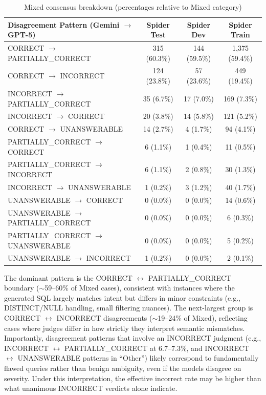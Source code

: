 \documentclass[]{einformatica}
\begin{document}
\begin{table}[ht]
    \caption{Mixed consensus breakdown (percentages relative to Mixed category)}
    \label{tab:mixed_breakdown}
    \centering
    \footnotesize
    \begin{tabular}{lccc}
        \toprule
        \textbf{Disagreement Pattern (Gemini $\rightarrow$ GPT-5)} & \textbf{Spider Test} & \textbf{Spider Dev} & \textbf{Spider Train} \\
        \midrule
        CORRECT $\rightarrow$ PARTIALLY\_CORRECT & 315 (60.3\%) & 144 (59.5\%) & 1,375 (59.4\%) \\
        CORRECT $\rightarrow$ INCORRECT & 124 (23.8\%) & 57 (23.6\%) & 449 (19.4\%) \\
        INCORRECT $\rightarrow$ PARTIALLY\_CORRECT & 35 (6.7\%) & 17 (7.0\%) & 169 (7.3\%) \\
        INCORRECT $\rightarrow$ CORRECT & 20 (3.8\%) & 14 (5.8\%) & 121 (5.2\%) \\
        CORRECT $\rightarrow$ UNANSWERABLE & 14 (2.7\%) & 4 (1.7\%) & 94 (4.1\%) \\
        PARTIALLY\_CORRECT $\rightarrow$ CORRECT & 6 (1.1\%) & 1 (0.4\%) & 11 (0.5\%) \\
        PARTIALLY\_CORRECT $\rightarrow$ INCORRECT & 6 (1.1\%) & 2 (0.8\%) & 30 (1.3\%) \\
        INCORRECT $\rightarrow$ UNANSWERABLE & 1 (0.2\%) & 3 (1.2\%) & 40 (1.7\%) \\
        UNANSWERABLE $\rightarrow$ CORRECT & 0 (0.0\%) & 0 (0.0\%) & 14 (0.6\%) \\
        UNANSWERABLE $\rightarrow$ PARTIALLY\_CORRECT & 0 (0.0\%) & 0 (0.0\%) & 6 (0.3\%) \\
        PARTIALLY\_CORRECT $\rightarrow$ UNANSWERABLE & 0 (0.0\%) & 0 (0.0\%) & 5 (0.2\%) \\
        UNANSWERABLE $\rightarrow$ INCORRECT & 1 (0.2\%) & 0 (0.0\%) & 2 (0.1\%) \\
        \bottomrule
    \end{tabular}
\end{table}

The dominant pattern is the CORRECT $\leftrightarrow$ PARTIALLY\_CORRECT boundary ($\sim$59--60\% of Mixed cases), consistent with instances where the generated SQL largely matches intent but differs in minor constraints (e.g., DISTINCT/NULL handling, small filtering nuances). The next-largest group is CORRECT $\leftrightarrow$ INCORRECT disagreements ($\sim$19--24\% of Mixed), reflecting cases where judges differ in how strictly they interpret semantic mismatches. Importantly, disagreement patterns that involve an INCORRECT judgment (e.g., INCORRECT $\leftrightarrow$ PARTIALLY\_CORRECT at 6.7--7.3\%, and INCORRECT $\leftrightarrow$ UNANSWERABLE patterns in ``Other'') likely correspond to fundamentally flawed queries rather than benign ambiguity, even if the models disagree on severity. Under this interpretation, the effective incorrect rate may be higher than what unanimous INCORRECT verdicts alone indicate.
\end{document}
